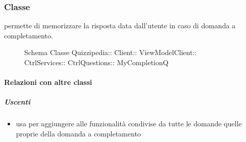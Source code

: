 \subsubsection{Classe }
permette di memorizzare la risposta data dall'utente in caso di domanda a completamento.
\begin{figure}[H]
\centering
\noindent{}
\caption[Schema Classe MyCompletionQ]{Schema Classe Quizzipedia:: Client:: ViewModelClient:: CtrlServices:: CtrlQuestions:: MyCompletionQ}
\end{figure}
\paragraph{Relazioni con altre classi}
\subparagraph{Uscenti}
\begin{itemize}
\item usa  per aggiungere alle funzionalità condivise da tutte le domande quelle proprie della domanda a completamento
\end{itemize}
